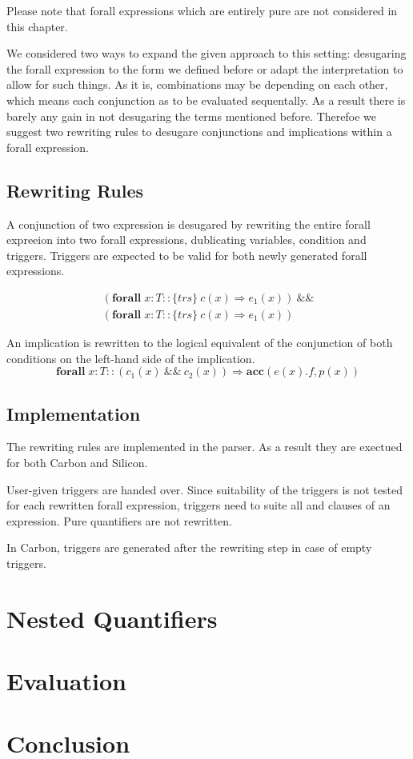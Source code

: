 \documentclass[12pt]{article}
\begin{document}
Please note that forall expressions which are entirely pure are not considered in this chapter.


We considered two ways to expand the given approach to this setting: desugaring the forall expression to the form we defined before or adapt the interpretation to allow for such things. As it is, combinations may be depending on each other, which means each conjunction as to be evaluated sequentally. As a result there is barely any gain in not desugaring the terms mentioned before. Therefoe we suggest two rewriting rules to desugare conjunctions and implications within a forall expression.

\subsection{Rewriting Rules}
A conjunction of two expression is desugared by rewriting the entire forall expreeion into two forall expressions, dublicating variables, condition and triggers. Triggers are expected to be valid for both newly generated forall expressions.

\begin{equation}
\begin{aligned}
	(\mathbf{forall} \; x:T :: \{trs\}\   c(x)  \Rightarrow e_1(x)) \ \&\& \\
	(\mathbf{forall} \; x:T :: \{trs\}\   c(x) \Rightarrow  e_1(x))
\end{aligned}
\end{equation}

An implication is rewritten to the logical equivalent of the conjunction of both conditions on the left-hand side of the implication.
\begin{equation}
	\mathbf{forall} \; x:T ::( c_1(x) \:\&\&\: c_2(x)) \Rightarrow \mathbf{acc}(e(x).f, p(x))
\end{equation}

\subsection{Implementation}
The rewriting rules are implemented in the parser. As a result they are exectued for both Carbon and Silicon.

User-given triggers are handed over. Since suitability of the triggers is not tested for each rewritten forall expression, triggers need to suite all and clauses of an expression. Pure quantifiers are not rewritten. 

 In Carbon, triggers are generated after the rewriting step in case of empty triggers.


\section{Nested Quantifiers}
\section{Evaluation}
\section{Conclusion}



\end{document}
